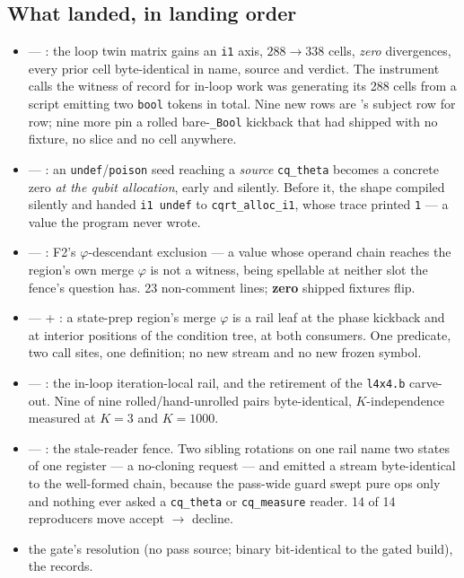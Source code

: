 \subsection*{What landed, in landing order}
\begin{itemize}
  \item {} --- : the loop twin matrix gains an \texttt{i1} axis, \(288 \to 338\)
    cells, \emph{zero} divergences, every prior cell byte-identical in name, source and verdict. The
    instrument  calls the witness of record for in-loop work was generating its 288 cells
    from a script emitting two \texttt{bool} tokens in total. Nine new rows are 's subject row for
    row; nine more pin a rolled bare-\texttt{\_Bool} kickback that had shipped with no fixture, no slice and
    no cell anywhere.
  \item {} --- : an \texttt{undef}/\texttt{poison} seed reaching a \emph{source}
    \texttt{cq\_theta} becomes a concrete zero \emph{at the qubit allocation}, early and silently. Before
    it, the shape compiled silently and handed \texttt{i1 undef} to \texttt{cqrt\_alloc\_i1}, whose trace
    printed \texttt{1} --- a value the program never wrote.
  \item {} --- : F2's \(\varphi\)-descendant exclusion --- a value whose operand
    chain reaches the region's own merge \(\varphi\) is not a witness, being spellable at neither slot the
    fence's question has. 23 non-comment lines; \textbf{zero} shipped fixtures flip.
  \item {} ---  + : a state-prep region's merge \(\varphi\) is a rail leaf
    at the phase kickback and at interior positions of the condition tree, at both consumers. One predicate,
    two call sites, one definition; no new stream and no new frozen symbol.
  \item {} --- : the in-loop iteration-local rail, and the retirement of the
    \texttt{l4x4.b} carve-out. Nine of nine rolled/hand-unrolled pairs byte-identical, \(K\)-independence
    measured at \(K=3\) and \(K=1000\).
  \item {} --- : the stale-reader fence. Two sibling rotations on one rail name two
    states of one register --- a no-cloning request --- and emitted a stream byte-identical to the
    well-formed chain, because the pass-wide guard swept pure ops only and nothing ever asked a
    \texttt{cq\_theta} or \texttt{cq\_measure} reader. 14 of 14 reproducers move accept \(\to\) decline.
  \item {} the gate's resolution (no pass source; binary bit-identical to the gated build),
     the records.
\end{itemize}

